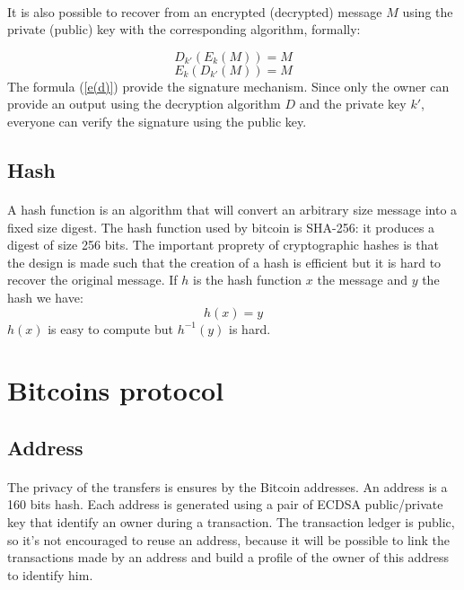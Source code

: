 \documentclass[letterpaper]{article}
\begin{document}
\paragraph{}
It is also possible to recover from an encrypted
(decrypted) message $M$ using the private (public) key with the
corresponding algorithm, formally:

\begin{equation}
    D_{k'}(E_k(M)) = M
\end{equation}
\begin{equation}
    \label{e(d)}
    E_{k}(D_{k'}(M)) = M
\end{equation}
The formula (\ref{e(d)}) provide the signature mechanism. Since only
the owner can provide an output using the decryption algorithm $D$ and
the private key $k'$, everyone can verify the signature using the public key.


\subsection{Hash}

\paragraph{}
A hash function is an algorithm that will convert an arbitrary
size message into a fixed size digest. The hash function
used by bitcoin is SHA-256: it produces a digest of size 256 bits.
The important proprety of cryptographic hashes is that the design is made
such that the creation of a hash is efficient but it is hard to recover the
original message. If $h$ is the hash function $x$ the message and $y$ the hash
we have:
\begin{equation}
    h(x) = y
\end{equation}
$h(x)$ is easy to compute but $h^{-1}(y)$ is hard.

\section{Bitcoins protocol}

\subsection{Address}
\paragraph{}
The privacy of the transfers is ensures by the Bitcoin addresses. An address
is a 160 bits hash. Each address
is generated using a pair of ECDSA\cite{ecdsawiki} public/private key
that identify an owner
during a transaction. The transaction ledger is public, so it's not encouraged
to reuse an address, because it will be possible to link the transactions
made by an address and build a profile of the owner of this address to identify
him.
\end{document}
